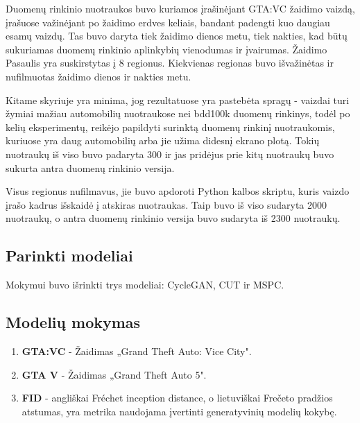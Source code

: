 \documentclass{VUMIFPSkursinis}
\begin{document}
            Duomenų rinkinio nuotraukos buvo kuriamos įrašinėjant GTA:VC žaidimo vaizdą, įrašuose važinėjant po žaidimo erdves keliais, bandant padengti kuo daugiau esamų vaizdų. Tas buvo daryta tiek žaidimo dienos metu, tiek nakties, kad būtų sukuriamas duomenų rinkinio aplinkybių vienodumas ir įvairumas. Žaidimo Pasaulis yra suskirstytas į 8 regionus. Kiekvienas regionas buvo išvažinėtas ir nufilmuotas žaidimo dienos ir nakties metu.
            
            Kitame skyriuje yra minima, jog rezultatuose yra pastebėta spragų - vaizdai turi žymiai mažiau automobilių nuotraukose nei bdd100k duomenų rinkinys, todėl po kelių eksperimentų, reikėjo papildyti surinktą duomenų rinkinį nuotraukomis, kuriuose yra daug automobilių arba jie užima didesnį ekrano plotą. Tokių nuotraukų iš viso buvo padaryta 300 ir jas pridėjus prie kitų nuotraukų buvo sukurta antra duomenų rinkinio versija.
            
            Visus regionus nufilmavus, jie buvo apdoroti Python kalbos skriptu, kuris vaizdo įrašo kadrus išskaidė į atskiras nuotraukas. Taip buvo iš viso sudaryta 2000 nuotraukų, o antra duomenų rinkinio versija buvo sudaryta iš 2300 nuotraukų.

        \subsection{Parinkti modeliai}
            Mokymui buvo išrinkti trys modeliai: CycleGAN, CUT ir MSPC.
        \subsection{Modelių mokymas}


\begin{enumerate}
\item \textbf{GTA:VC} - Žaidimas „Grand Theft Auto: Vice City".
\item \textbf{GTA V} - Žaidimas „Grand Theft Auto 5".
\item \textbf{FID} - angliškai Fréchet inception distance, o lietuviškai Frečeto pradžios atstumas, yra metrika naudojama įvertinti generatyvinių modelių kokybę.
\end{enumerate}

\printbibliography[heading=bibintoc]
\end{document}
